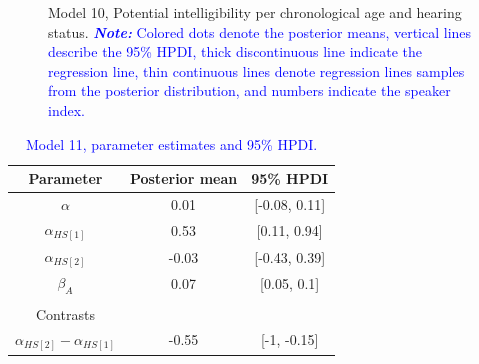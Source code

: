 \documentclass[
  authoryear,
  preprint,
  1p]{elsarticle}
\begin{document}
\label{cell-fig-rq3-intelligibility-model10}
\begin{figure}[H]


\caption{\label{fig-rq3-intelligibility-model10}Model 10, Potential
intelligibility per chronological age and hearing status.
\textcolor{blue}{\textbf{\emph{Note:}} Colored dots denote the posterior means, vertical
lines describe the 95\% HPDI, thick discontinuous line indicate the
regression line, thin continuous lines denote regression lines samples
from the posterior distribution, and numbers indicate the speaker
index.}}

\end{figure}%

\begin{longtable}[]{@{}ccc@{}}

\caption{\label{tbl-parameter-model11}\textcolor{blue}{Model 11, parameter estimates and
95\% HPDI.}}

\tabularnewline

\toprule\noalign{}
Parameter & Posterior mean & 95\% HPDI \\
\midrule\noalign{}
\endhead
\bottomrule\noalign{}
\endlastfoot
\(\alpha\) & 0.01 & {[}-0.08, 0.11{]} \\
\(\alpha_{HS[1]}\) & 0.53 & {[}0.11, 0.94{]} \\
\(\alpha_{HS[2]}\) & -0.03 & {[}-0.43, 0.39{]} \\
\(\beta_{A}\) & 0.07 & {[}0.05, 0.1{]} \\
& & \\
Contrasts & & \\
\(\alpha_{HS[2]} - \alpha_{HS[1]}\) & -0.55 & {[}-1, -0.15{]} \\

\end{longtable}
\end{document}
